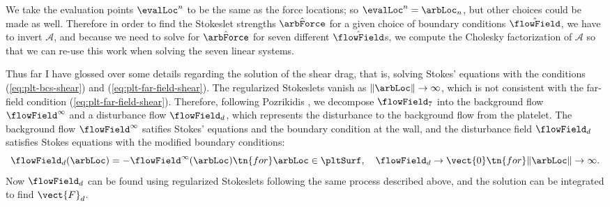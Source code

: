 We take the evaluation points $\evalLoc^n$ to be the same as the force
locations; so $\evalLoc^n = \arbLoc_n$, but other choices could be
made as well. Therefore in order to find the Stokeslet strengths
$\hat{\arbForce}$ for a given choice of boundary conditions
$\hat{\flowField}$, we have to invert $\mathcal{A}$, and because we
need to solve for $\hat{\arbForce}$ for seven different
$\hat{\flowField}$s, we compute the Cholesky factorization of
$\mathcal{A}$ so that we can re-use this work when solving the seven
linear systems.

Thus far I have glossed over some details regarding the solution of
the shear drag, that is, solving Stokes' equations with the conditions
(\ref{eq:plt-bcs-shear}) and (\ref{eq:plt-far-field-shear}). The
regularized Stokeslets vanish as $\|\arbLoc\| \rightarrow \infty$,
which is not consistent with the far-field condition
(\ref{eq:plt-far-field-shear}). Therefore, following Pozrikidis
\cite{Pozrikidis92}, we decompose $\flowField_7$ into the background
flow $\flowField^\infty$ and a disturbance flow $\flowField_d$, which
represents the disturbance to the background flow from the
platelet. The background flow $\flowField^\infty$ satifies Stokes'
equations and the boundary condition at the wall, and the disturbance
field $\flowField_d$ satisfies Stokes equations with the modified
boundary conditions:
\begin{equation}
  \label{eq:disturbance-bcs}
  \flowField_d(\arbLoc) = -\flowField^\infty(\arbLoc) \tn{ for }
  \arbLoc \in \pltSurf, \quad \flowField_d \rightarrow \vect{0} \tn{
    for } \|\arbLoc\| \rightarrow \infty.
\end{equation}
Now $\flowField_d$ can be found using regularized Stokeslets following
the same process described above, and the solution can be integrated
to find $\vect{F}_d$.

